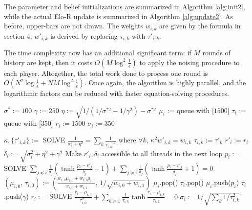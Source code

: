 \documentclass{article}
\begin{document}
The parameter and belief initializations are summarized in Algorithm \ref{alg:init2}, while the actual Elo-R update is summarized in Algorithm \ref{alg:update2}. As before, upper-bars are not drawn. The weights $w_{i,k}$ are given by the formula in section 4; $w'_{i,k}$ is derived by replacing $\tau_{i,k}$ with $\tau'_{i,k}$.

The time complexity now has an additional significant term: if $M$ rounds of history are kept, then it costs $O(M\log^2\frac 1\epsilon)$ to apply the noising procedure to each player. Altogether, the total work done to process one round is $O(N^2\log\frac 1\epsilon + NM\log^2\frac 1\epsilon)$. Once again, the algorithm is highly parallel, and the logarithmic factors can be reduced with faster equation-solving procedures.

\begin{algorithm}
\caption{$init()$}
\label{alg:init2}
\begin{algorithmic}
\STATE $\sigma^* := 100$
\STATE $\gamma := 250$
\STATE $\eta := \sqrt{1 / \left( 1/\sigma^{*2} - 1/\gamma^2 \right) - \sigma^{*2}}$
\STATE $\mu_i$ := queue with [$1500$]
\STATE $\tau_i$ := queue with [$350$]
\STATE $r_i := 1500$
\STATE $\sigma_i := 350$
\ENDFOR
\end{algorithmic}
\end{algorithm}

\begin{algorithm}
\caption{$update()$}
\label{alg:update2}
\begin{algorithmic}
\STATE $\kappa,\{\tau'_{i,k}\} := $ SOLVE $\frac{1}{\sigma_i^2 + \eta^2} = \sum_k\frac{1}{\tau_{i,k}'^2}\text{ where }\forall k,\,\kappa^2w'_{i,k} = w_{i,k}$
\STATE $\tau_{i,k} := \tau'_k$
\ENDFOR
\STATE $r'_i := r_i$
\STATE $\delta_i := \sqrt{\sigma_i^2 + \eta^2 + \gamma^2}$
\STATE Make $r'_i,\delta_i$ accessible to all threads in the next loop
\ENDFOR
{}
\STATE $p_i := $ SOLVE $\sum_{j\preceq i}\frac{1}{\delta_j}\left( \tanh\frac {p_i - r'_j} {\delta_j} - 1 \right) + \sum_{j\succeq i}\frac{1}{\delta_j}\left( \tanh\frac {p_i - r'_j} {\delta_j} + 1 \right) = 0$
\STATE $(\mu_{i,0},\,\tau_{i,0}) := (\frac{w_{i,0}\mu_{i,0}+w_{i,1}\mu_{i,1}}{w_{i,0}+w_{i,1}},\,1 / \sqrt{w_{i,0}+w_{i,1}})$
\STATE $\mu_i$.pop()
\STATE $\tau_i$.pop()
\ENDIF
\STATE $\mu_i$.push($p_i$)
\STATE $\tau_i$.push($\gamma$)
\STATE $r_i := $ SOLVE $\frac{r_i-\mu_{i,0}}{\tau_{i,0}^2} + \sum_{k\ge 1} \frac{1}{\tau_{i,k}} \tanh \frac {r_i-\mu_{i,k}} {\tau_{i,k}} = 0$
\STATE $\sigma_i := 1 / \sqrt{\sum_k 1/\tau_{i,k}^2}$
\ENDFOR
\end{algorithmic}
\end{algorithm}
\end{document}
